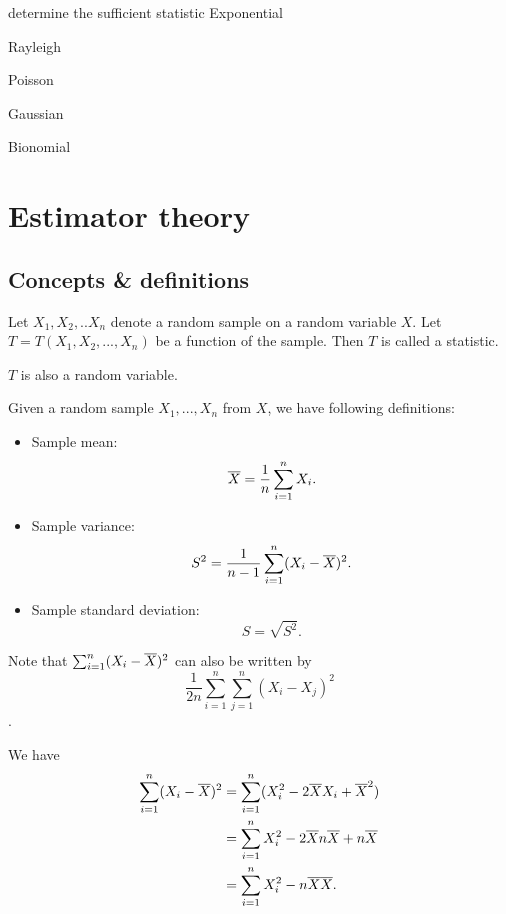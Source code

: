 \begin{refsection}
determine the sufficient statistic
Exponential

Rayleigh

Poisson

Gaussian

Bionomial
\fi

\section{Estimator theory}

\subsection{Concepts \& definitions}






\begin{definition}[statistic]
Let $X_1,X_2,..X_n$ denote a random sample on a random variable $X$. Let 
$T=T(X_1,X_2,...,X_n)$ be a function of the sample. Then $T$ is called a statistic.
\end{definition}

\begin{remark}
$T$ is also a random variable.
\end{remark}

\begin{definition}\hfill
Given a random sample $X_1,...,X_n$ from $X$, we have following definitions:
\begin{itemize}
	\item Sample mean:
	$$\overline{X} = \frac{1}{n}\sum_{i=1}^n X_i.$$
	\item Sample variance:
	$$S^2 = \frac{1}{n-1}\sum_{i=1}^n (X_i - \overline{X})^2.$$
	\item Sample standard deviation:
	$$S = \sqrt{S^2}.$$
\end{itemize}
\end{definition}

\begin{remark}
Note that $\sum_{i=1}^n (X_i - \overline{X})^2$ can also be written by $$\frac{1}{2n}\sum_{i=1}^n\sum_{j=1}^n (X_i - X_j)^2$$.

We have
\begin{align*}
\sum_{i=1}^n (X_i - \overline{X})^2 &= \sum_{i=1}^n (X_i^2 - 2\overline{X}X_i + \overline{X}^2) \\
								&= \sum_{i=1}^n X_i^2 - 2\overline{X}n\overline{X} + n\overline{X} \\
								&= \sum_{i=1}^n X_i^2 - n\overline{X}\overline{X}.
\end{align*}



\end{remark}
\end{refsection}

